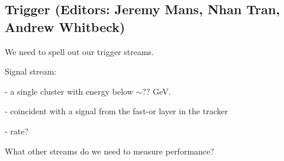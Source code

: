 
\subsection{Trigger (Editors: Jeremy Mans, Nhan Tran, Andrew Whitbeck)}

We need to spell out our trigger streams. 

Signal stream: 

- a single cluster with energy below $\sim ??$ GeV. 

- coincident with a signal from the fast-or layer in the tracker

- rate? 

What other streams do we need to measure performance? 
